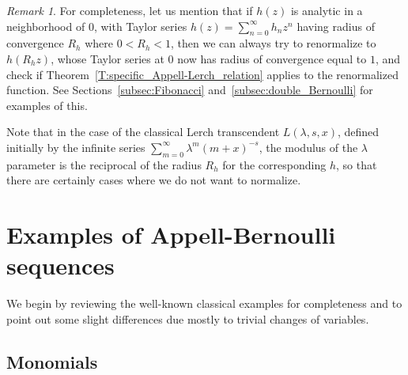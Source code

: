 \documentclass[11pt,a4paper]{amsart}
\theoremstyle{plain}
\theoremstyle{plain}
\theoremstyle{definition}
\theoremstyle{remark}
\newtheorem*{remark}{Remark}
\begin{document}
\begin{remark}
For completeness, let us mention that if $h(z)$ is analytic in a neighborhood of $0$, with Taylor series $h(z) = \sum_{n=0}^{\infty} h_{n} z^{n}$ having radius of convergence $R_{h}$ where $0 < R_{h} < 1$, then we can always try to renormalize to $h(R_{h}z)$, whose Taylor series at $0$ now has radius of convergence equal to $1$, and check if Theorem~\ref{T:specific_Appell-Lerch_relation} applies to the renormalized function. See Sections~\ref{subsec:Fibonacci} and~\ref{subsec:double_Bernoulli} for examples of this.

Note that in the case of the classical Lerch transcendent $L(\lambda,s,x)$, defined initially by the infinite series $\sum_{m=0}^{\infty} \lambda^{m} (m+x)^{-s}$, the modulus of the $\lambda$ parameter is the reciprocal of the radius $R_{h}$ for the corresponding $h$, so that there are certainly cases where we do not want to normalize.
\end{remark}



\section{Examples of Appell-Bernoulli sequences}
\label{sec:Appell-Bernoulli_examples}



We begin by reviewing the well-known classical examples for completeness and to point out some slight differences due mostly to trivial changes of variables.


\subsection{Monomials} 
\end{document}
